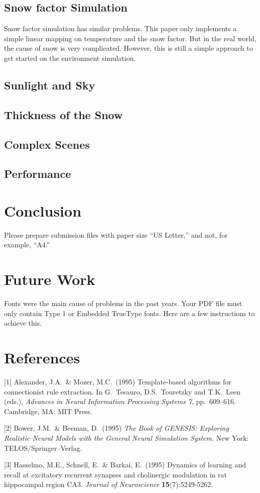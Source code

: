 \documentclass{article}
\begin{document}
\subsection {Snow factor Simulation}
Snow factor simulation has similar problems. This paper only implements a simple linear mapping on temperature and the snow factor. But
in the real world, the cause of snow is very complicated. However, this is still a simple approach to get started on the environment
simulation. 

\subsection {Sunlight and Sky}

\subsection {Thickness of the Snow}

\subsection {Complex Scenes}

\subsection {Performance}

\section{Conclusion}
Please prepare submission files with paper size ``US Letter,'' and not, for
example, ``A4.''

\section{Future Work}

Fonts were the main cause of problems in the past years. Your PDF file must only
contain Type 1 or Embedded TrueType fonts. Here are a few instructions to
achieve this.


\section*{References}

{
\small


[1] Alexander, J.A.\ \& Mozer, M.C.\ (1995) Template-based algorithms for
connectionist rule extraction. In G.\ Tesauro, D.S.\ Touretzky and T.K.\ Leen
(eds.), {\it Advances in Neural Information Processing Systems 7},
pp.\ 609--616. Cambridge, MA: MIT Press.


[2] Bower, J.M.\ \& Beeman, D.\ (1995) {\it The Book of GENESIS: Exploring
  Realistic Neural Models with the General Neural Simulation System.}  New York:
TELOS/Springer--Verlag.


[3] Hasselmo, M.E., Schnell, E.\ \& Barkai, E.\ (1995) Dynamics of learning and
recall at excitatory recurrent synapses and cholinergic modulation in rat
hippocampal region CA3. {\it Journal of Neuroscience} {\bf 15}(7):5249-5262.
}
\end{document}
